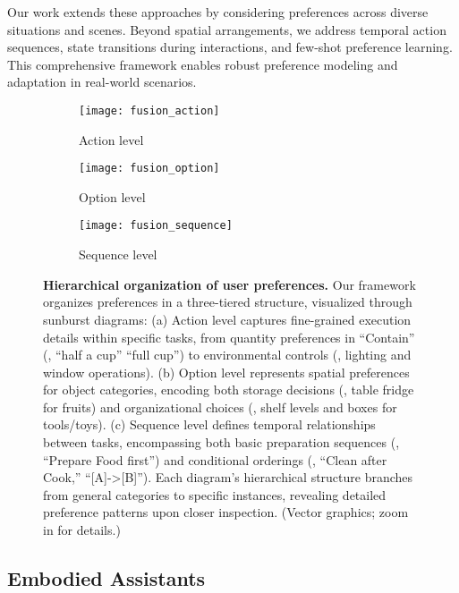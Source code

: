 Our work extends these approaches by considering preferences across diverse situations and scenes. Beyond spatial arrangements, we address temporal action sequences, state transitions during interactions, and few-shot preference learning. This comprehensive framework enables robust preference modeling and adaptation in real-world scenarios.

\begin{figure}[b!]
    \centering
    \small
    \begin{subfigure}{0.333\linewidth}
        \centering
        \texttt{[image: fusion\_action]}
        \caption{Action level}
    \end{subfigure}%
    \hfill
    \begin{subfigure}{0.333\linewidth}
        \centering
        \texttt{[image: fusion\_option]}
        \caption{Option level}
    \end{subfigure}%
    \hfill
    \begin{subfigure}{0.333\linewidth}
        \centering
        \texttt{[image: fusion\_sequence]}
        \caption{Sequence level}
    \end{subfigure}%
    \caption{\textbf{Hierarchical organization of user preferences.} Our framework organizes preferences in a three-tiered structure, visualized through sunburst diagrams: (a) Action level captures fine-grained execution details within specific tasks, from quantity preferences in ``Contain'' (\eg, ``half a cup'' \vs ``full cup'') to environmental controls (\eg, lighting and window operations). (b) Option level represents spatial preferences for object categories, encoding both storage decisions (\eg, table \vs fridge for fruits) and organizational choices (\eg, shelf levels and boxes for tools/toys). (c) Sequence level defines temporal relationships between tasks, encompassing both basic preparation sequences (\eg, ``Prepare Food first'') and conditional orderings (\eg, ``Clean after Cook,'' ``[A]->[B]''). Each diagram's hierarchical structure branches from general categories to specific instances, revealing detailed preference patterns upon closer inspection. (Vector graphics; zoom in for details.)}
    \label{fig:statistics}
\end{figure}

\subsection{Embodied Assistants}


